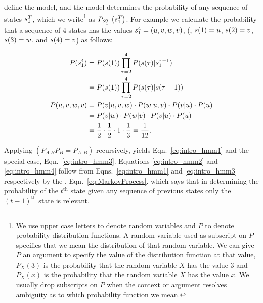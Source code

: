 define the model, and the model determines the probability of any
sequence of states $s_{1}^{T}$, which we write\footnote{We use
  upper case letters to denote random variables and $P$ to denote
  probability distribution functions.  A random variable used as
  subscript on $P$ specifies that we mean the distribution of that
  random variable.  We can give $P$ an argument to specify the value
  of the distribution function at that value, \eg $P_X(3)$ is the
  probability that the random variable $X$ has the value 3 and
  $P_X(x)$ is the probability that the random variable $X$ has the
  value $x$.  We usually drop subscripts on $P$ when the context or
  argument resolves ambiguity as to which probability function we
  mean.} as $P_{S_{1}^{T}}\left( s_{1}^{T} \right)$.  For
example we calculate the probability that a sequence of 4 states has
the values $s_{1}^{4} = (u,v,w,v)$, (\ie, ${s}{(1)} = u$,
${s}{(2)} = v$, ${s}{(3)} = w$, and ${s}{(4)} = v$) as follows:

\begin{align}
  \label{eq:intro_hmm1}
  P(\ts{s}{1}{4}) &= P(\ti{s}{1}) \prod_{\tau=2}^4 %
                     P(\ti{s}{\tau}|\ts{s}{1}{\tau-1})\\
  \label{eq:intro_hmm2}
                  &= P(\ti{s}{1}) \prod_{\tau=2}^4 %
                     P(\ti{s}{\tau}|\ti{s}{\tau-1}) \\
  \label{eq:intro_hmm3}
  P(u,v,w,v)      &= P(v|u,v,w) \cdot P(w|u,v) \cdot  P(v|u) \cdot P(u)\\
  \label{eq:intro_hmm4}
        &= P(v|w) \cdot P(w|v) \cdot  P(v|u) \cdot P(u)\\
  \label{eq:intro_hmm5}
        &= \frac{1}{2} \cdot \frac{1}{2} \cdot 1 %
                     \cdot \frac{1}{3} = \frac{1}{12}.
\end{align}

Applying  $\left( P_{A|B} P_B = P_{A,B} \right)$
recursively, yields Eqn.~\eqref{eq:intro_hmm1} and the special case,
Eqn.~\eqref{eq:intro_hmm3}.  Equations \eqref{eq:intro_hmm2} and
\eqref{eq:intro_hmm4} follow from Eqns.~\eqref{eq:intro_hmm1} and
\eqref{eq:intro_hmm3} respectively by the %
\emph{}, Eqn.~\eqref{eq:MarkovProcess}.
which says that in determining the probability of the $t^\text{th}$
state given any sequence of previous states only the $(t-1)^\text{th}$
state is relevant. %


